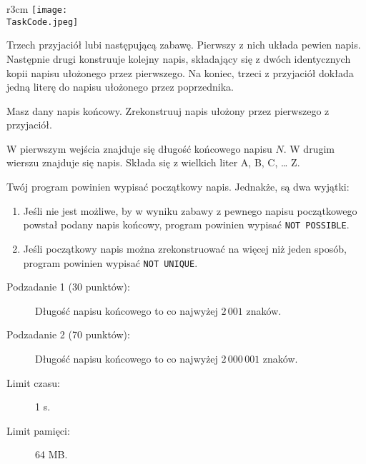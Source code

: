 \documentclass{boi2014-pl}
\renewcommand{\TaskCode}{friends}
\begin{document}
    \begin{wrapfigure}{r}{3cm}
		\texttt{[image: \\TaskCode.jpeg]}
	\end{wrapfigure}
    Trzech przyjaciół lubi następującą zabawę.
    Pierwszy z nich układa pewien napis.
    Następnie drugi konstruuje kolejny napis, składający się z dwóch identycznych kopii napisu ułożonego przez pierwszego.
    Na koniec, trzeci z przyjaciół dokłada jedną literę do napisu ułożonego przez poprzednika.

    \Task
    Masz dany napis końcowy. Zrekonstruuj napis ułożony przez pierwszego z przyjaciół.

    \Input
    W pierwszym wejścia znajduje się długość końcowego napisu $N$.
    W drugim wierszu znajduje się napis.
    Składa się z wielkich liter A, B, C, \ldots{} Z.

    \Output
    Twój program powinien wypisać początkowy napis.
    Jednakże, są dwa wyjątki:
    \begin{enumerate}
        \item Jeśli nie jest możliwe, by w wyniku zabawy z pewnego napisu początkowego powstał podany napis końcowy, program powinien wypisać {\tt NOT POSSIBLE}.
        \item Jeśli początkowy napis można zrekonstruować na więcej niż jeden sposób, program powinien wypisać {\tt NOT
        UNIQUE}.
    \end{enumerate}
    

    \Examples


    \Scoring

    \begin{description}
        \item[Podzadanie 1 (30 punktów):] Długość napisu końcowego to co najwyżej $2\,001$ znaków.
        \item[Podzadanie 2 (70 punktów):] Długość napisu końcowego to co najwyżej $2\,000\,001$ znaków.
    \end{description}

    \Constraints

    \begin{description}
        \item[Limit czasu:] 1 s.
        \item[Limit pamięci:] 64 MB.
    \end{description}
\end{document}
